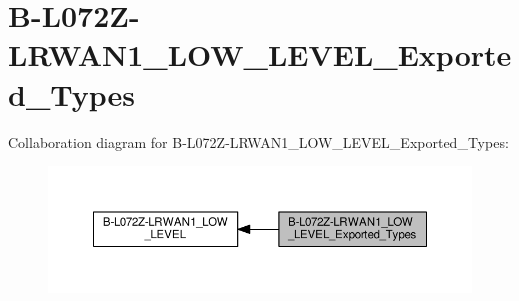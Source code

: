 \hypertarget{group__B-L072Z-LRWAN1__LOW__LEVEL__Exported__Types}{}\section{B-\/\+L072\+Z-\/\+L\+R\+W\+A\+N1\+\_\+\+L\+O\+W\+\_\+\+L\+E\+V\+E\+L\+\_\+\+Exported\+\_\+\+Types}
\label{group__B-L072Z-LRWAN1__LOW__LEVEL__Exported__Types}
Collaboration diagram for B-\/\+L072\+Z-\/\+L\+R\+W\+A\+N1\+\_\+\+L\+O\+W\+\_\+\+L\+E\+V\+E\+L\+\_\+\+Exported\+\_\+\+Types\+:
\nopagebreak
\begin{figure}[H]
\begin{center}
\leavevmode
\includegraphics[width=350pt]{group__B-L072Z-LRWAN1__LOW__LEVEL__Exported__Types}
\end{center}
\end{figure}

